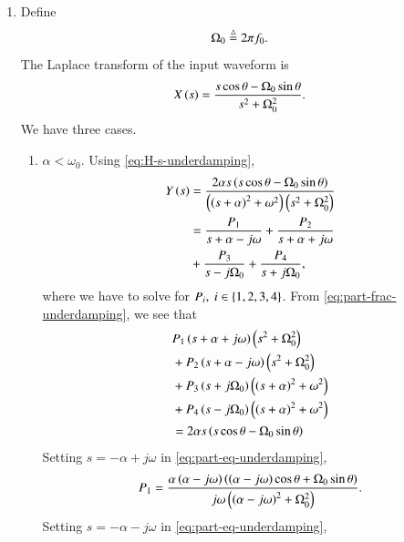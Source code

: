 \documentclass[journal,12pt,twocolumn]{IEEEtran}
\begin{document}
\begin{enumerate}[label=\theenumi.]
    \item Define
    \begin{equation}
        \Omega_0 \stackrel{\triangle}{=} 2\pi{}f_0.
        \label{eq:Omega-def}
    \end{equation}
    The Laplace transform of the input waveform is
    \begin{equation}
        X\left(s\right) = \frac{s\cos\theta-\Omega_0\sin\theta}{s^2 + \Omega_0^2}.
        \label{eq:X-s-9}
    \end{equation}
    We have three cases.
    \begin{enumerate}
        \item \(\alpha < \omega_0\). Using \eqref{eq:H-s-underdamping},
        \begin{align}
            Y\left(s\right) &= \frac{2\alpha{}s\left(s\cos\theta - \Omega_0\sin\theta\right)}{\left(\left(s+\alpha\right)^2+\omega^2\right)\left(s^2+\Omega_0^2\right)} \\
            &= \frac{P_1}{s+\alpha-j\omega} + \frac{P_2}{s+\alpha+j\omega} \nonumber \\
            &+ \frac{P_3}{s-j\Omega_0} + \frac{P_4}{s+j\Omega_0},
            \label{eq:part-frac-underdamping}
        \end{align}
        where we have to solve for \(P_i,\ i \in \left\{1,2,3,4\right\}\). From 
        \eqref{eq:part-frac-underdamping}, we see that
        \begin{align}
            &P_1\left(s+\alpha+j\omega\right)\left(s^2+\Omega_0^2\right) \nonumber \\
            &+ P_2\left(s+\alpha-j\omega\right)\left(s^2+\Omega_0^2\right) \nonumber \\
            &+ P_3\left(s+j\Omega_0\right)\left(\left(s+\alpha\right)^2+\omega^2\right) \nonumber \\
            &+ P_4\left(s-j\Omega_0\right)\left(\left(s+\alpha\right)^2+\omega^2\right) \nonumber \\
            &= 2\alpha{}s\left(s\cos\theta-\Omega_0\sin\theta\right)
            \label{eq:part-eq-underdamping}
        \end{align}
        Setting \(s = -\alpha+j\omega\) in \eqref{eq:part-eq-underdamping},
        \begin{equation}
            P_1 = \frac{\alpha\left(\alpha-j\omega\right)\left(\left(\alpha-j\omega\right)\cos\theta+\Omega_0\sin\theta\right)}{j\omega\left(\left(\alpha-j\omega\right)^2+\Omega_0^2\right)}.
            \label{eq:P-1-def-underdamping}
        \end{equation}
        Setting \(s = -\alpha-j\omega\) in \eqref{eq:part-eq-underdamping},
        \begin{align}

\end{align}
\end{enumerate}
\end{enumerate}
\end{document}
